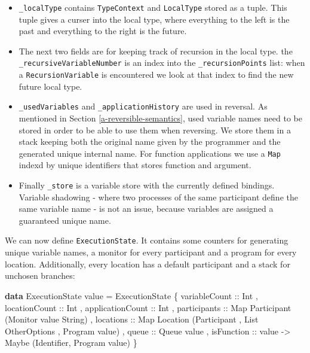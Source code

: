 \documentclass[runningheads,plain]{llncs}
\newenvironment{Shaded}{}{}
\newcommand{\KeywordTok}[1]{\textcolor[rgb]{0.00,0.44,0.13}{\textbf{#1}}}
\newcommand{\DataTypeTok}[1]{\textcolor[rgb]{0.56,0.13,0.00}{#1}}
\newcommand{\OtherTok}[1]{\textcolor[rgb]{0.00,0.44,0.13}{#1}}
\newcommand{\FunctionTok}[1]{\textcolor[rgb]{0.02,0.16,0.49}{#1}}
\newcommand{\NormalTok}[1]{#1}
\begin{document}
\begin{itemize}
\item
  \texttt{\_localType} contains \texttt{TypeContext} and
  \texttt{LocalType} stored as a tuple. This tuple gives a curser into
  the local type, where everything to the left is the past and
  everything to the right is the future.
\item
  The next two fields are for keeping track of recursion in the local
  type. the \texttt{\_recursiveVariableNumber} is an index into the
  \texttt{\_recursionPoints} list: when a \texttt{RecursionVariable} is
  encountered we look at that index to find the new future local type.
\item
  \texttt{\_usedVariables} and \texttt{\_applicationHistory} are used in
  reversal. As mentioned in Section \ref{a-reversible-semantics}, used
  variable names need to be stored in order to be able to use them when
  reversing. We store them in a stack keeping both the original name
  given by the programmer and the generated unique internal name. For
  function applications we use a \texttt{Map} indexd by unique
  identifiers that stores function and argument.
\item
  Finally \texttt{\_store} is a variable store with the currently
  defined bindings. Variable shadowing - where two processes of the same
  participant define the same variable name - is not an issue, because
  variables are assigned a guaranteed unique name.
\end{itemize}

We can now define \texttt{ExecutionState}. It contains some counters for
generating unique variable names, a monitor for every participant and a
program for every location. Additionally, every location has a default
participant and a stack for unchosen branches:

\begin{Shaded}
\begin{Highlighting}[]
\KeywordTok{data} \DataTypeTok{ExecutionState}\NormalTok{ value }\FunctionTok{=} 
    \DataTypeTok{ExecutionState} 
\NormalTok{        \{}\OtherTok{ variableCount ::} \DataTypeTok{Int}
\NormalTok{        ,}\OtherTok{ locationCount ::} \DataTypeTok{Int}
\NormalTok{        ,}\OtherTok{ applicationCount ::} \DataTypeTok{Int}
\NormalTok{        ,}\OtherTok{ participants ::} \DataTypeTok{Map} \DataTypeTok{Participant}\NormalTok{ (}\DataTypeTok{Monitor}\NormalTok{ value }\DataTypeTok{String}\NormalTok{)}
\NormalTok{        ,}\OtherTok{ locations ::} \DataTypeTok{Map} \DataTypeTok{Location} 
\NormalTok{                 (}\DataTypeTok{Participant}\NormalTok{ , }\DataTypeTok{List} \DataTypeTok{OtherOptions}\NormalTok{ , }\DataTypeTok{Program}\NormalTok{ value)}
\NormalTok{        ,}\OtherTok{ queue ::} \DataTypeTok{Queue}\NormalTok{ value}
\NormalTok{        ,}\OtherTok{ isFunction ::}\NormalTok{ value }\OtherTok{->} \DataTypeTok{Maybe}\NormalTok{ (}\DataTypeTok{Identifier}\NormalTok{, }\DataTypeTok{Program}\NormalTok{ value)}
\NormalTok{        \}}
\end{Highlighting}
\end{Shaded}
\end{document}
